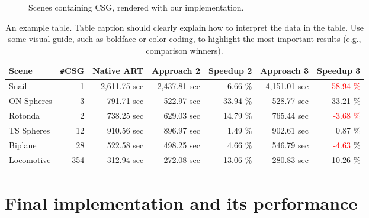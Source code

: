 \begin{figure}[H]
	\hfill
	
	\caption{Scenes containing CSG, rendered with our implementation.}
	\label{fig:csg_figures}
\end{figure}

\begin{table}[H]
	\centering
	{\footnotesize\sf
		\begin{tabular}{lrrrrrr}
			\toprule
			Scene & \Verb!#!CSG & Native ART & Approach 2 & Speedup 2 & Approach 3 & Speedup 3 \\ 
			\midrule
			Snail & 1 & 2,611.75 sec & 2,437.81 sec & 6.66 \% & 4,151.01 sec & \textcolor{red}{-58.94 \%}  \\
			ON Spheres & 3 & 791.71 sec & 522.97 sec & 33.94 \% & 528.77 sec & 33.21 \% \\
			Rotonda & 2 & 738.25 sec & 629.03 sec & 14.79 \% & 765.44 sec & \textcolor{red}{-3.68 \%}  \\
			\addlinespace %
			TS Spheres & 12 & 910.56 sec & 896.97 sec & 1.49 \% & 902.61 sec & 0.87 \% \\
			Biplane & 28 & 522.58 sec & 498.25 sec & 4.66 \% & 546.79 sec & \textcolor{red}{-4.63} \% \\
			Locomotive & 354 & 312.94 sec & 272.08 sec & 13.06 \% & 280.83 sec & 10.26 \% \\
			\bottomrule
	\end{tabular}}
	\caption{An example table. Table caption should clearly explain how to interpret the data in the table. Use some visual guide, such as boldface or color coding, to highlight the most important results (e.g., comparison winners).}
	\label{tab:csg}
\end{table}




\section{Final implementation and its performance}
\label{sec:result_normal}

